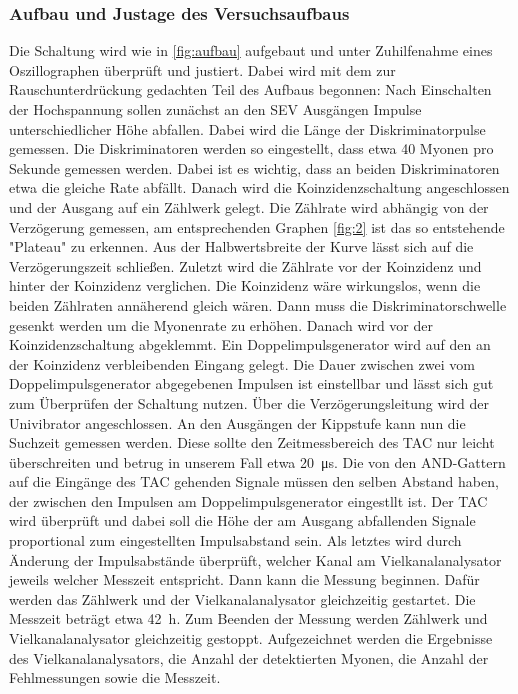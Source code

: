 \documentclass[
  bibliography=totoc,     %
  captions=tableheading,  %
  titlepage=firstiscover, %
]{scrartcl}
\begin{document}
  \subsubsection{Aufbau und Justage des Versuchsaufbaus}
  Die Schaltung wird wie in \ref{fig:aufbau} aufgebaut und unter Zuhilfenahme eines Oszillographen
  überprüft und justiert. Dabei wird mit dem zur Rauschunterdrückung gedachten
  Teil des Aufbaus begonnen:
  Nach Einschalten der Hochspannung sollen zunächst an den SEV Ausgängen Impulse
  unterschiedlicher Höhe abfallen.
  Dabei wird die Länge der Diskriminatorpulse gemessen.
  Die Diskriminatoren werden so eingestellt, dass etwa 40
  Myonen pro Sekunde gemessen werden. Dabei ist es wichtig, dass an beiden
  Diskriminatoren etwa die gleiche Rate abfällt.
  Danach wird die Koinzidenzschaltung angeschlossen und der Ausgang auf ein
  Zählwerk gelegt. Die Zählrate wird abhängig von der Verzögerung gemessen, am
  entsprechenden Graphen \ref{fig:2} ist das so entstehende "Plateau" zu erkennen. Aus der Halbwertsbreite
  der Kurve lässt sich auf die Verzögerungszeit schließen.
  Zuletzt wird die Zählrate vor der Koinzidenz und hinter der Koinzidenz verglichen.
  Die Koinzidenz wäre wirkungslos, wenn die beiden Zählraten annäherend gleich wären.
  Dann muss die Diskriminatorschwelle gesenkt werden um die
  Myonenrate zu erhöhen.
  Danach wird vor der Koinzidenzschaltung abgeklemmt. Ein
  Doppelimpulsgenerator wird auf den an der Koinzidenz verbleibenden Eingang gelegt.
  Die Dauer zwischen zwei vom Doppelimpulsgenerator abgegebenen Impulsen ist einstellbar
  und lässt sich gut zum Überprüfen der Schaltung nutzen.
  Über die Verzögerungsleitung wird der Univibrator angeschlossen. An den
  Ausgängen der Kippstufe kann nun die Suchzeit gemessen werden. Diese sollte den
  Zeitmessbereich des TAC nur leicht überschreiten und betrug in unserem Fall etwa
  \SI{20}{\micro\second}. Die von den AND-Gattern auf die Eingänge des TAC gehenden
  Signale müssen den selben Abstand haben, der zwischen den Impulsen am Doppelimpulsgenerator
  eingestllt ist. Der TAC wird überprüft und dabei soll die Höhe der am Ausgang abfallenden
  Signale proportional zum eingestellten Impulsabstand sein.
  Als letztes wird durch Änderung der Impulsabstände überprüft, welcher Kanal
  am Vielkanalanalysator jeweils welcher Messzeit entspricht. Dann kann die Messung
  beginnen. Dafür werden das Zählwerk und der Vielkanalanalysator gleichzeitig
  gestartet. Die Messzeit beträgt etwa \SI{42}{\hour}.
  Zum Beenden der Messung werden Zählwerk und Vielkanalanalysator gleichzeitig gestoppt.
  Aufgezeichnet werden die Ergebnisse des Vielkanalanalysators, die Anzahl der detektierten
  Myonen, die Anzahl der Fehlmessungen sowie die Messzeit.
\clearpage
\end{document}
